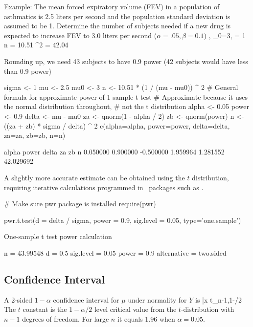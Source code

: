 \item Example: The mean forced expiratory volume (FEV) in a population of asthmatics is 2.5 liters per second and the population standard deviation is assumed to be 1.  Determine the number of subjects needed if a new drug is expected to increase FEV to 3.0 liters per second ($\alpha = .05, \beta = 0.1$)
\beqa
{}, \mu_0=3, \sigma = 1 \\
n = 10.51 ^{2} = 42.04
\eeqa
  \bi
  \item \textrm{Rounding up, we need 43 subjects to have 0.9 power (42 subjects would have less than 0.9 power)}
  \ei
\ei
\begin{Schunk}
\begin{Sinput}
sigma <- 1
mu    <- 2.5
mu0   <- 3
n     <- 10.51 * (1 / (mu - mu0)) ^ 2
# General formula for approximate power of 1-sample t-test
# Approximate because it uses the normal distribution throughout,
# not the t distribution
alpha <- 0.05
power <- 0.9
delta <- mu - mu0
za    <- qnorm(1 - alpha / 2)
zb    <- qnorm(power)
n     <- ((za + zb) * sigma / delta) ^ 2
c(alpha=alpha, power=power, delta=delta, za=za, zb=zb, n=n)
\end{Sinput}
\begin{Soutput}
    alpha     power     delta        za        zb         n 
 0.050000  0.900000 -0.500000  1.959964  1.281552 42.029692 
\end{Soutput}
\end{Schunk}
A slightly more accurate estimate can be obtained using the $t$
distribution, requiring iterative calculations programmed in \R\
packages such as .
\begin{Schunk}
\begin{Sinput}
# Make sure pwr package is installed
require(pwr)
\end{Sinput}
\begin{Sinput}
pwr.t.test(d = delta / sigma, power = 0.9, sig.level = 0.05, type='one.sample')
\end{Sinput}
\begin{Soutput}

     One-sample t test power calculation 

              n = 43.99548
              d = 0.5
      sig.level = 0.05
          power = 0.9
    alternative = two.sided
\end{Soutput}
\end{Schunk}

\subsection{Confidence Interval} 
A 2-sided $1-\alpha$ confidence interval for $\mu$ under normality for $Y$ is
\beq
\bar{x} \pm t_{n-1,1-\alpha/2} 
\eeq
The $t$ constant is the $1-\alpha/2$ level critical value from the
$t$-distribution with $n-1$ degrees of freedom.  For large $n$ it
equals 1.96 when $\alpha=0.05$.

